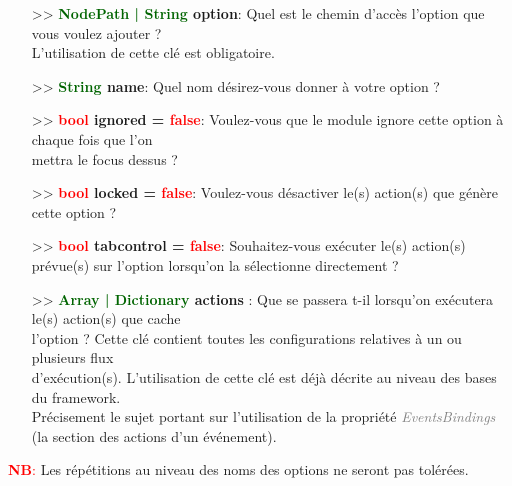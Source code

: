 \documentclass[a4paper, 11pt]{article}
\begin{document}
	\begin{itemize}
		\item[>> \textbf{\textcolor{darkgreen}{NodePath | String} option}:] Quel est le chemin d'accès
		l'option que vous voulez ajouter ? \\L'utilisation de cette clé est obligatoire.\\
		\item[>> \textbf{\textcolor{darkgreen}{String} name}:] Quel nom désirez-vous donner à votre option ?
		\\
		\item[>> \textbf{\textcolor{red}{bool} ignored = \textcolor{red}{false}}:] Voulez-vous que le module 
		ignore cette option à chaque fois que l'on \\mettra le focus dessus ?\\
		\item[>> \textbf{\textcolor{red}{bool} locked = \textcolor{red}{false}}:] Voulez-vous désactiver 
		le(s) action(s) que génère cette option ?\\
		\item[>> \textbf{\textcolor{red}{bool} tabcontrol = \textcolor{red}{false}}:] Souhaitez-vous 
		exécuter le(s) action(s) prévue(s) sur l'option lorsqu'on la sélectionne directement ?\\
		\item[>> \textbf{\textcolor{darkgreen}{Array | Dictionary} actions}]: Que se passera t-il lorsqu'on 
		exécutera le(s) action(s) que cache \\l'option ? Cette clé contient toutes les configurations
		relatives à un ou plusieurs flux \\d'exécution(s). L'utilisation de cette clé est déjà décrite au
		niveau des bases du framework. \\Précisement le sujet portant sur l'utilisation de la propriété 
		\textit{\textcolor{gray}{EventsBindings}} (la section des actions d'un événement).\\
	\end{itemize}
	\textcolor{red}{\textbf{NB}:} Les répétitions au niveau des noms des options ne seront pas tolérées.

\end{document}
